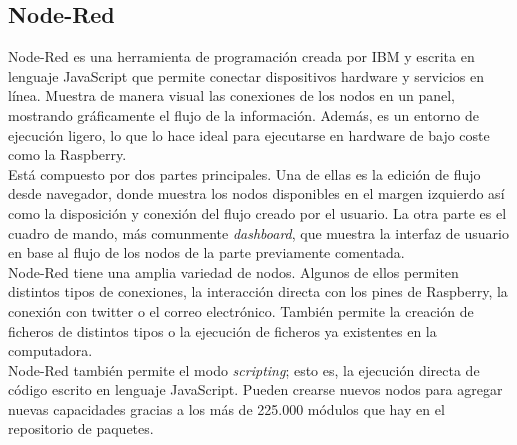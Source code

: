 \subsection{Node-Red}
\label{sec:nodered}
Node-Red es una herramienta de programación creada por IBM y escrita en lenguaje JavaScript que permite conectar dispositivos hardware y servicios en línea. Muestra de manera visual las conexiones de los nodos en un panel, mostrando gráficamente el flujo de la información. Además, es un entorno de ejecución ligero, lo que lo hace ideal para ejecutarse en hardware de bajo coste como la Raspberry.\\

Está compuesto por dos partes principales. Una de ellas es la edición de flujo desde navegador, donde muestra los nodos disponibles en el margen izquierdo así como la disposición y conexión del flujo creado por el usuario. La otra parte es el cuadro de mando, más comunmente \textit{dashboard}, que muestra la interfaz de usuario en base al flujo de los nodos de la parte previamente comentada.\\

Node-Red tiene una amplia variedad de nodos. Algunos de ellos permiten distintos tipos de conexiones, la interacción directa con los pines de Raspberry, la conexión con twitter o el correo electrónico. También permite la creación de ficheros de distintos tipos o la ejecución de ficheros ya existentes en la computadora.\\

Node-Red también permite el modo \textit{scripting}; esto es, la ejecución directa de código escrito en lenguaje JavaScript. Pueden crearse nuevos nodos para agregar nuevas capacidades gracias a los más de 225.000 módulos que hay en el repositorio de paquetes.\\

